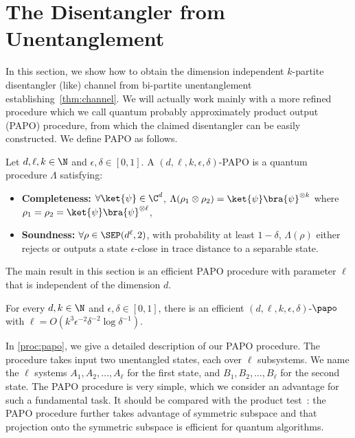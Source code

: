 \section{The Disentangler from Unentanglement}\label{sec:papo}

In this section, we show how to obtain the dimension independent $k$-partite disentangler (like) channel from bi-partite unentanglement establishing~\cref{thm:channel}.
We will actually work mainly with a more refined procedure which we call quantum probably approximately product output (PAPO) procedure, from which the claimed disentangler can be easily constructed. We define PAPO as follows.

\begin{definition}[PAPO]\label{def:papo}
Let $d, \ell, k \in \N$ and $\epsilon,\delta \in [0,1]$.
A $(d,\ell, k, \epsilon,\delta)$-\textup{PAPO} is a quantum procedure $\Lambda$ satisfying:
    \begin{itemize}[label={}]
        \item \textbf{\textup{Completeness:}} $\forall \ket{\psi} \in \C^d$, $\Lambda(\rho_1 \otimes \rho_2) = \ket{\psi}\bra{\psi}^{\otimes k}$ where $\rho_1=\rho_2=\ket{\psi}\bra{\psi}^{\otimes \ell}$,
        \item \textbf{\textup{Soundness:}} $\forall \rho \in \SEP(d^\ell,2)$, 
   with probability at least $1-\delta$, $\Lambda(\rho)$ either rejects or outputs a state $\epsilon$-close in trace distance to a separable state.
\end{itemize}
\end{definition}

The main result in this section is an efficient PAPO procedure with parameter $\ell$ that is independent of
the dimension $d$. 

\begin{theorem}\label{thm:papo}
  For every $d,k \in \N$ and $\epsilon, \delta \in [0,1]$, there is an efficient $(d,\ell,k,\epsilon,\delta)$-$\papo$
  with $\ell = O(k^3\epsilon^{-2}\delta^{-2}\log\delta^{-1})$.
\end{theorem}



In \cref{proc:papo}, we give a detailed description of our PAPO
procedure. The procedure takes input two unentangled states, each over $\ell$ subsystems. We name the $\ell$ systems $A_1, A_2, \ldots, A_\ell$ for the first state, and $B_1, B_2, \ldots, B_\ell$ for the second state. The PAPO procedure is very simple, which we consider an
advantage for such a fundamental task.  It should be compared with the product test~\cite{HM13}: the PAPO procedure further takes advantage of
symmetric subspace and that projection onto the symmetric subspace is
efficient for quantum algorithms. 

